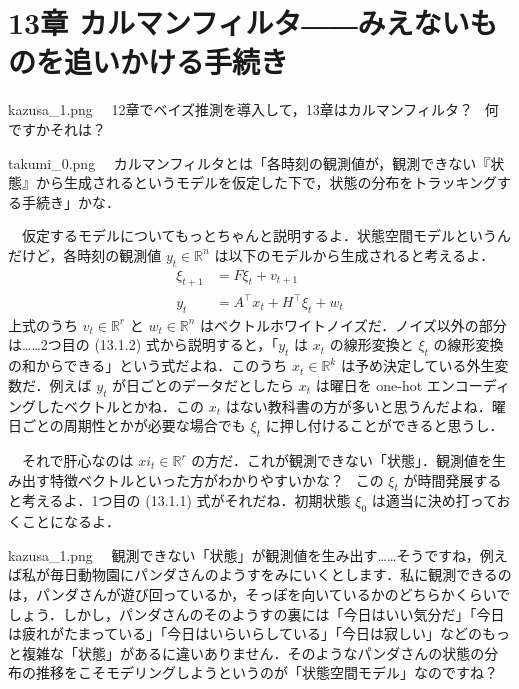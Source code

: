 \documentclass[b5paper,xelatex,ja=standard,10pt]{bxjsarticle}
\begin{document}
\section*{13章 カルマンフィルタ――みえないものを追いかける手続き}


\begin{SERIFU}[colback=PaleIris]{kazusa_1.png}
　12章でベイズ推測を導入して，13章はカルマンフィルタ？ \, 何ですかそれは？
\end{SERIFU}


\begin{SERIFU}[colback=PaleGold]{takumi_0.png}
　カルマンフィルタとは「各時刻の観測値が，観測できない『状態』から生成されるというモデルを仮定した下で，状態の分布をトラッキングする手続き」かな．

　仮定するモデルについてもっとちゃんと説明するよ．{状態空間モデル}というんだけど，各時刻の観測値 $y_t \in \mathbb{R}^n$ は以下のモデルから生成されると考えるよ．
\begin{align}
\xi_{t+1} &= F \xi_t + v_{t + 1} \tag{13.1.1} \\
y_t &= A^\top x_t + H^\top \xi_t + w_t \tag{13.1.2}
\end{align}
上式のうち $v_t \in \mathbb{R}^r$ と $w_t \in \mathbb{R}^n$ はベクトルホワイトノイズだ．ノイズ以外の部分は……2つ目の (13.1.2) 式から説明すると，「$y_t$ は $x_t$ の線形変換と $\xi_t$ の線形変換の和からできる」という式だよね．このうち $x_t \in \mathbb{R}^k$ は予め決定している外生変数だ．例えば $y_t$ が日ごとのデータだとしたら $x_t$ は曜日を one-hot エンコーディングしたベクトルとかね．この $x_t$ はない教科書の方が多いと思うんだよね．曜日ごとの周期性とかが必要な場合でも $\xi_t$ に押し付けることができると思うし．

　それで肝心なのは $xi_t \in \mathbb{R}^r$ の方だ．これが観測できない「状態」．観測値を生み出す特徴ベクトルといった方がわかりやすいかな？ \, この $\xi_t$ が時間発展すると考えるよ．1つ目の (13.1.1) 式がそれだね．初期状態 $\xi_0$ は適当に決め打っておくことになるよ．
\end{SERIFU}


\begin{SERIFU}[colback=PaleIris]{kazusa_1.png}
　観測できない「状態」が観測値を生み出す……そうですね，例えば私が毎日動物園にパンダさんのようすをみにいくとします．私に観測できるのは，パンダさんが遊び回っているか，そっぽを向いているかのどちらかくらいでしょう．しかし，パンダさんのそのようすの裏には「今日はいい気分だ」「今日は疲れがたまっている」「今日はいらいらしている」「今日は寂しい」などのもっと複雑な「状態」があるに違いありません．そのようなパンダさんの状態の分布の推移をこそモデリングしようというのが「状態空間モデル」なのですね？
\end{SERIFU}
\end{document}
